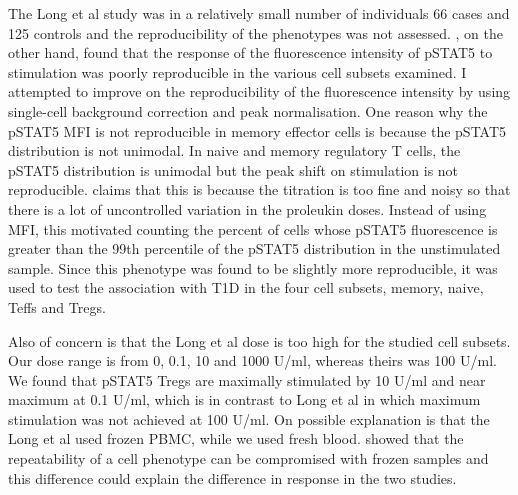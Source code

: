 The Long et al study was in a relatively small number of individuals 66 cases and 125 controls and the reproducibility of the phenotypes was not assessed.
, on the other hand, found that the response of the fluorescence intensity of pSTAT5 to stimulation was poorly reproducible in the various cell subsets
examined.  I attempted to improve on the reproducibility of the fluorescence intensity by using single-cell background correction and peak normalisation.
One reason why the pSTAT5 MFI is not reproducible in memory effector cells is because the pSTAT5 distribution is not unimodal.
In naive and memory regulatory T cells, the pSTAT5 distribution is unimodal but the peak shift on stimulation is not reproducible.
 claims that this is because the titration is too fine and noisy so that there is a lot of uncontrolled variation in the proleukin doses.
Instead of using MFI, this motivated counting the percent of cells whose pSTAT5 fluorescence is greater than the 99th percentile of the pSTAT5 distribution in the unstimulated sample.
Since this phenotype was found to be slightly more reproducible, it was used to test the association with T1D in the four cell subsets, memory, naive, Teffs and Tregs.




Also of concern is that the Long et al dose is too high for the studied cell subsets.
Our dose range is from 0, 0.1, 10 and 1000 U/ml, whereas theirs was 100 U/ml.
We found that pSTAT5 Tregs are maximally stimulated by 10 U/ml and near maximum at 0.1 U/ml,
which is in contrast to Long et al in which maximum stimulation was not achieved at 100 U/ml.
On possible explanation is that the Long et al used frozen \gls{PBMC}, while we used fresh blood.
\cite{Dendrou:2009dv} showed that the repeatability of a cell phenotype can be compromised with frozen samples
and this difference could explain the difference in response in the two studies.

